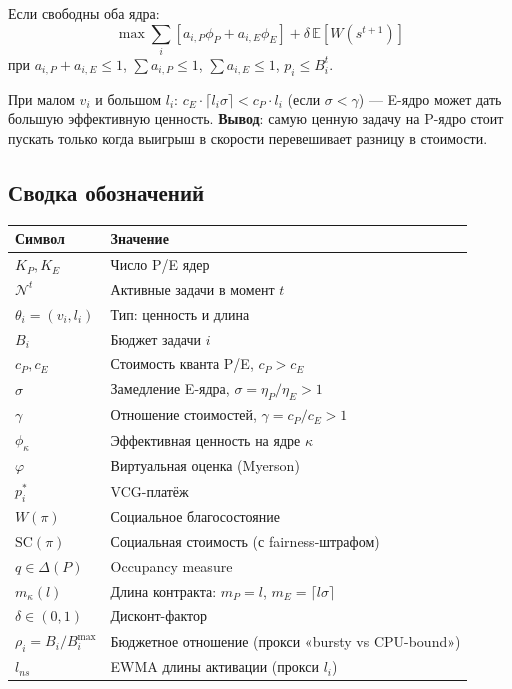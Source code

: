 \documentclass[11pt,a4paper]{article}
\begin{document}
Если свободны оба ядра:
\[
\max\sum_i[a_{i,P}\phi_P+a_{i,E}\phi_E]+\delta\,\mathbb{E}[W(s^{t+1})]
\]
при $a_{i,P}+a_{i,E}\leq 1$, $\sum a_{i,P}\leq 1$, $\sum a_{i,E}\leq 1$,
$p_i\leq B_i^t$.

\begin{why}
При малом $v_i$ и большом $l_i$: $c_E\cdot\lceil l_i\sigma\rceil<c_P\cdot l_i$
(если $\sigma<\gamma$) — E-ядро может дать большую эффективную
ценность. \textbf{Вывод}: самую ценную задачу на P-ядро стоит пускать
только когда выигрыш в скорости перевешивает разницу в стоимости.
\end{why}

\subsection{Сводка обозначений}

\begin{center}\small
\begin{tabular}{@{}ll@{}}
\toprule
Символ & Значение\\
\midrule
$K_P,K_E$         & Число P/E ядер\\
$\mathcal{N}^t$   & Активные задачи в момент $t$\\
$\theta_i=(v_i,l_i)$ & Тип: ценность и длина\\
$B_i$             & Бюджет задачи $i$\\
$c_P, c_E$        & Стоимость кванта P/E, $c_P>c_E$\\
$\sigma$          & Замедление E-ядра, $\sigma=\eta_P/\eta_E>1$\\
$\gamma$          & Отношение стоимостей, $\gamma=c_P/c_E>1$\\
$\phi_\kappa$     & Эффективная ценность на ядре $\kappa$\\
$\varphi$         & Виртуальная оценка (Myerson)\\
$p_i^*$           & VCG-платёж\\
$W(\pi)$          & Социальное благосостояние\\
$\mathrm{SC}(\pi)$& Социальная стоимость (с fairness-штрафом)\\
$q\in\Delta(P)$   & Occupancy measure\\
$m_\kappa(l)$     & Длина контракта: $m_P=l$, $m_E=\lceil l\sigma\rceil$\\
$\delta\in(0,1)$  & Дисконт-фактор\\
$\rho_i=B_i/B_i^{\max}$ & Бюджетное отношение (прокси «bursty vs CPU-bound»)\\
$l_{ns}$          & EWMA длины активации (прокси $l_i$)\\
\bottomrule
\end{tabular}
\end{center}
\end{document}
